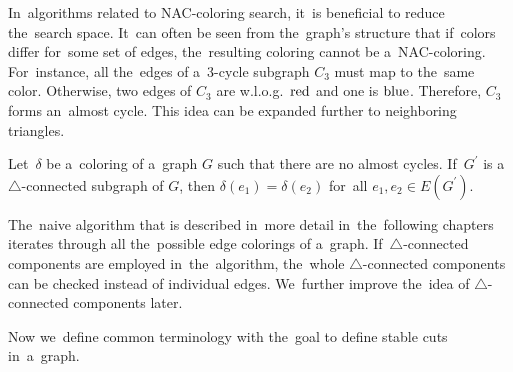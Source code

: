In~algorithms related to NAC-coloring search, it~is beneficial
to reduce the~search space.
It~can often be seen from the~graph's structure
that if~colors differ for~some set of edges,
the~resulting coloring cannot be a~NAC-coloring.
%
For~instance, all the~edges of a~3-cycle subgraph \( C_3 \) must map to the~same color.
Otherwise, two edges of \( C_3 \) are w.l.o.g.\ \( \text{red} \) and one is \( \text{blue} \).
Therefore, \( C_3 \) forms an~almost cycle.
This idea can be expanded further to neighboring triangles.
%
%
\begin{lemma}
	Let~\( \delta \) be a~coloring of a~graph \( G \) such that there are
	no almost cycles. If~\( G^\prime \) is
	a~\( \triangle \)-connected subgraph of \( G \),
	then \( \delta(e_1) = \delta(e_2) \) for~all \( e_1, e_2 \in E(G^\prime) \).
\end{lemma}
%
The~naive algorithm that is described in~more detail in~the~following chapters
iterates through all the~possible edge colorings of a~graph.
If~\( \triangle \)-connected components are employed in~the~algorithm,
the~whole \( \triangle \)-connected components can be checked instead of individual edges.
We~further improve the~idea of \( \triangle \)-connected components later.

Now we~define common terminology with the~goal to define stable cuts in~a~graph.

